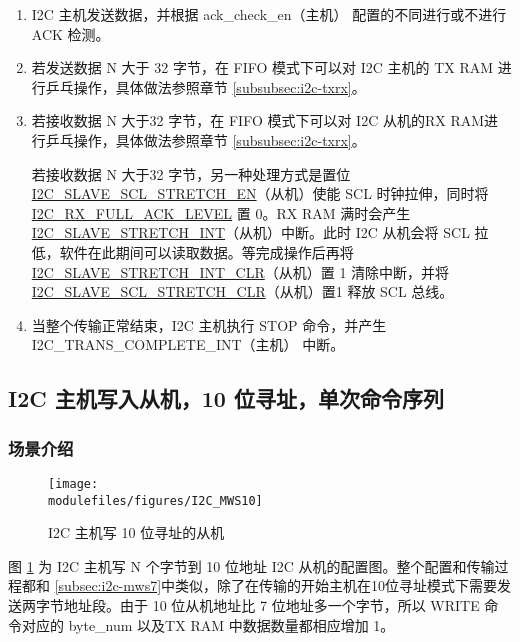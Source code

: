 \documentclass[main\_\_CN.tex]{subfiles}
\begin{document}
\begin{enumerate}
\item I2C 主机发送数据，并根据 ack\_check\_en（主机） 配置的不同进行或不进行 ACK 检测。
\item 若发送数据 N 大于 32 字节，在 FIFO 模式下可以对 I2C 主机的 TX RAM 进行乒乓操作，具体做法参照章节 \ref{subsubsec:i2c-txrx}。
\item 若接收数据 N 大于32 字节，在 FIFO 模式下可以对 I2C 从机的RX RAM进行乒乓操作，具体做法参照章节 \ref{subsubsec:i2c-txrx}。

若接收数据 N 大于32 字节，另一种处理方式是置位 \hyperref[fielddesc:I2CSLAVESCLSTRETCHEN]{I2C\_SLAVE\_SCL\_STRETCH\_EN}（从机）使能 SCL 时钟拉伸，同时将 \hyperref[fielddesc:I2CRXFULLACKLEVEL]{I2C\_RX\_FULL\_ACK\_LEVEL} 置 0。RX RAM 满时会产生 \hyperref[int:i2c-slave-stretch]{I2C\_SLAVE\_STRETCH\_INT}（从机）中断。此时 I2C 从机会将 SCL 拉低，软件在此期间可以读取数据。等完成操作后再将 \hyperref[fielddesc:I2CSLAVESTRETCHINTCLR]{I2C\_SLAVE\_STRETCH\_INT\_CLR}（从机）置 1 清除中断，并将\hyperref[fielddesc:I2CSLAVESCLSTRETCHCLR]{I2C\_SLAVE\_SCL\_STRETCH\_CLR}（从机）置1 释放 SCL 总线。
\item 当整个传输正常结束，I2C 主机执行 STOP 命令，并产生 I2C\_TRANS\_COMPLETE\_INT（主机） 中断。

\end{enumerate}




\subsection{I2C 主机写入从机，10 位寻址，单次命令序列}\label{sub:i2c-app-mws10}
\subsubsection{场景介绍}
\begin{figure}[H]
    \centering
    \texttt{[image: \\modulefiles/figures/I2C\_MWS10]}
    \caption{I2C 主机写 10 位寻址的从机}
    \label{fig:i2c-mws10}
\end{figure}


图 \ref{fig:i2c-mws10} 为 I2C 主机写 N 个字节到 10 位地址 I2C 从机的配置图。整个配置和传输过程都和 \ref{subsec:i2c-mws7}中类似，除了在传输的开始主机在10位寻址模式下需要发送两字节地址段。由于 10 位从机地址比 7 位地址多一个字节，所以 WRITE 命令对应的 byte\_num 以及TX RAM 中数据数量都相应增加 1。
\end{document}

